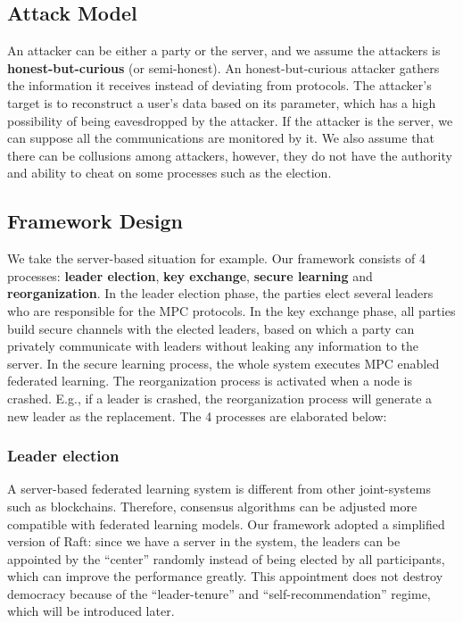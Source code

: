 \subsection{Attack Model}
An attacker can be either a party or the server, and we assume the attackers is \textbf{honest-but-curious} (or semi-honest). An honest-but-curious attacker gathers the information it receives instead of deviating from protocols. The attacker's target is to reconstruct a user's data based on its parameter, which has a high possibility of being eavesdropped by the attacker. If the attacker is the server, we can suppose all the communications are monitored by it. We also assume that there can be collusions among attackers, however, they do not have the authority and ability to cheat on some processes such as the election.

\subsection{Framework Design}
We take the server-based situation for example. Our framework consists of 4 processes: \textbf{leader election}, \textbf{key exchange}, \textbf{secure learning} and \textbf{reorganization}. In the leader election phase, the parties elect several leaders who are responsible for the MPC protocols. In the key exchange phase, all parties build secure channels with the elected leaders, based on which a party can privately communicate with leaders without leaking any information to the server. In the secure learning process, the whole system executes MPC enabled federated learning. The reorganization process is activated when a node is crashed. E.g., if a leader is crashed, the reorganization process will generate a new leader as the replacement. The 4 processes are elaborated below:

\subsubsection{\textbf{Leader election}}
A server-based federated learning system is different from other joint-systems such as blockchains. Therefore, consensus algorithms can be adjusted more compatible with federated learning models. Our framework adopted a simplified version of Raft: since we have a server in the system, the leaders can be appointed by the ``center'' randomly instead of being elected by all participants, which can improve the performance greatly. This appointment does not destroy democracy because of the ``leader-tenure'' and ``self-recommendation'' regime, which will be introduced later.

